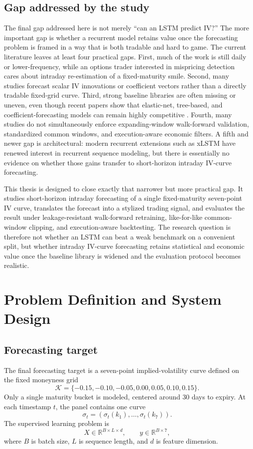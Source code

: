 \documentclass[12pt]{report}
\begin{document}
\section{Gap addressed by the study}
The final gap addressed here is not merely ``can an LSTM predict IV?'' The more important gap is whether a recurrent model retains value once the forecasting problem is framed in a way that is both tradable and hard to game. The current literature leaves at least four practical gaps. First, much of the work is still daily or lower-frequency, while an options trader interested in mispricing detection cares about intraday re-estimation of a fixed-maturity smile. Second, many studies forecast scalar IV innovations or coefficient vectors rather than a directly tradable fixed-grid curve. Third, strong baseline libraries are often missing or uneven, even though recent papers show that elastic-net, tree-based, and coefficient-forecasting models can remain highly competitive \citep{chen2024bspline,borochin2025,arratia2025}. Fourth, many studies do not simultaneously enforce expanding-window walk-forward validation, standardized common windows, and execution-aware economic filters. A fifth and newer gap is architectural: modern recurrent extensions such as xLSTM have renewed interest in recurrent sequence modeling, but there is essentially no evidence on whether those gains transfer to short-horizon intraday IV-curve forecasting.

This thesis is designed to close exactly that narrower but more practical gap. It studies short-horizon intraday forecasting of a single fixed-maturity seven-point IV curve, translates the forecast into a stylized trading signal, and evaluates the result under leakage-resistant walk-forward retraining, like-for-like common-window clipping, and execution-aware backtesting. The research question is therefore not whether an LSTM can beat a weak benchmark on a convenient split, but whether intraday IV-curve forecasting retains statistical and economic value once the baseline library is widened and the evaluation protocol becomes realistic.

\chapter{Problem Definition and System Design}

\section{Forecasting target}
The final forecasting target is a seven-point implied-volatility curve defined on the fixed moneyness grid
\[
\mathcal{K}=\{-0.15,-0.10,-0.05,0.00,0.05,0.10,0.15\}.
\]
Only a single maturity bucket is modeled, centered around 30 days to expiry. At each timestamp $t$, the panel contains one curve
\[
\sigma_t = (\sigma_t(k_1),\ldots,\sigma_t(k_7)).
\]
The supervised learning problem is
\[
X \in \mathbb{R}^{B\times L\times d}, \qquad y \in \mathbb{R}^{B\times 7},
\]
where $B$ is batch size, $L$ is sequence length, and $d$ is feature dimension.
\end{document}
